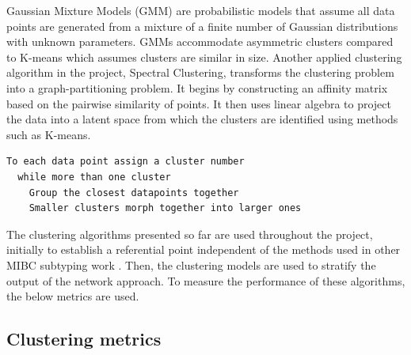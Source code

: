 Gaussian Mixture Models (GMM) are probabilistic models that assume all data points are generated from a mixture of a finite number of Gaussian distributions with unknown parameters. GMMs accommodate asymmetric clusters compared to K-means which assumes clusters are similar in size. Another applied clustering algorithm in the project, Spectral Clustering, transforms the clustering problem into a graph-partitioning problem. It begins by constructing an affinity matrix based on the pairwise similarity of points. It then uses linear algebra to project the data into a latent space from which the clusters are identified using methods such as K-means.
~\\
\begin{lstlisting}[caption={Agglomerative hierarchical clustering pseudocode}, label={code:agg_clustering}]
  To each data point assign a cluster number
  while more than one cluster
    Group the closest datapoints together 
    Smaller clusters morph together into larger ones
\end{lstlisting} 

The clustering algorithms presented so far are used throughout the project, initially to establish a referential point independent of the methods used in other MIBC subtyping work \cite{Robertson2017-mg, Marzouka2018-ge, Kamoun2020-tj}. Then, the clustering models are used to stratify the output of the network approach. To measure the performance of these algorithms, the below metrics are used.



\subsection{Clustering metrics} \label{s:lit:clustering_metrics}


